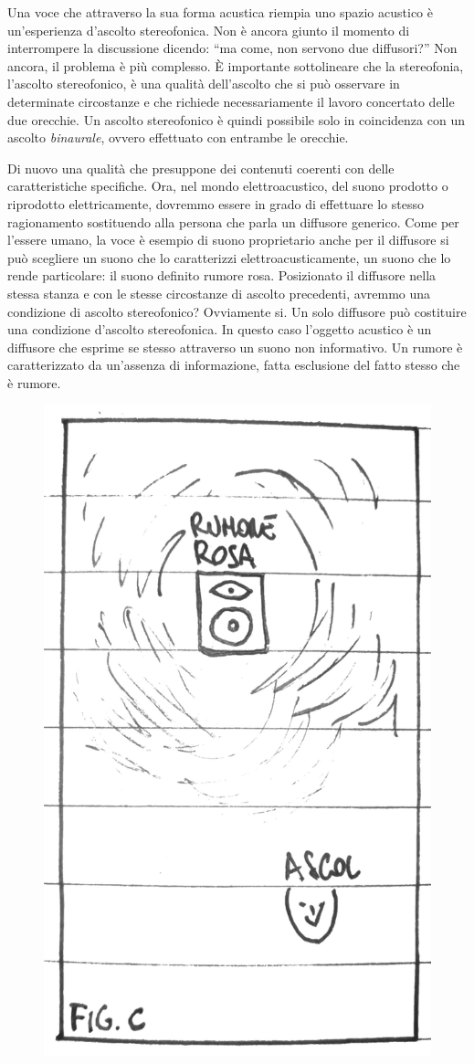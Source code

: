 Una voce che attraverso la sua forma acustica riempia uno spazio acustico è
un'esperienza d'ascolto stereofonica. Non è ancora giunto il momento di
interrompere la discussione dicendo: “ma come, non servono due diffusori?” Non
ancora, il problema è più complesso. È importante sottolineare che la stereofonia,
l'ascolto stereofonico, è una qualità dell'ascolto che si può osservare in
determinate circostanze e che richiede necessariamente il lavoro concertato delle
due orecchie. Un ascolto stereofonico è quindi possibile solo in coincidenza
con un ascolto \emph{binaurale}, ovvero effettuato con entrambe le orecchie.

Di nuovo una qualità che presuppone dei contenuti coerenti con delle
caratteristiche specifiche. Ora, nel mondo elettroacustico, del suono prodotto
o riprodotto elettricamente, dovremmo essere in grado di effettuare lo stesso
ragionamento sostituendo alla persona che parla un diffusore generico. Come per
l'essere umano, la voce è esempio di suono proprietario anche per il diffusore
si può scegliere un suono che lo caratterizzi elettroacusticamente, un suono
che lo rende particolare: il suono definito rumore rosa. Posizionato il diffusore
nella stessa stanza e con le stesse circostanze di ascolto precedenti, avremmo
una condizione di ascolto stereofonico? Ovviamente si. Un solo diffusore può
costituire una condizione d'ascolto stereofonica. In questo caso l'oggetto
acustico è un diffusore che esprime se stesso attraverso un suono non informativo.
Un rumore è caratterizzato da un'assenza di informazione, fatta esclusione del
fatto stesso che è rumore.

\begin{figure}[h]
\begin{center}
  \includegraphics[width=.48\linewidth]{CAPITOLI/1000/IMG/figc.png}
\label{ee:figc}
\end{center}
\end{figure}

